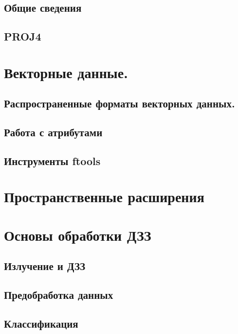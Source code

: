 \documentclass[ignorenonframetext,russian,hyperref={pdftex,unicode}]{beamer}        %
\begin{document}
    \subsection{Общие сведения}
    

    \subsection{PROJ4}
    


\section{Векторные данные.}
    \subsection{Распространенные форматы векторных данных.}
    

    \subsection{Работа с атрибутами}
    

    \subsection{Инструменты ftools}
    

    \section{Пространственные расширения}
    


\section{Основы обработки ДЗЗ}
    \subsection{Излучение и ДЗЗ}
    

    \subsection{Предобработка данных}
    

    \subsection{Классификация}
    
\end{document}
